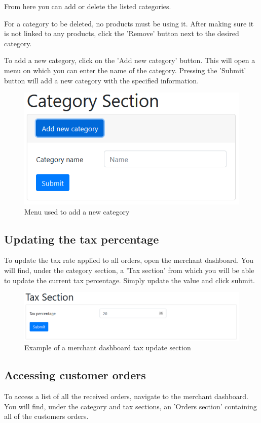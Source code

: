From here you can add or delete the listed categories.

For a category to be deleted, no products must be using it. After making sure it is not linked to any products, click the 'Remove' button next to the desired category.

To add a new category, click on the 'Add new category' button. This will open a menu on which you can enter the name of the category. Pressing the 'Submit' button will add a new category with the specified information.

\begin{figure}[H]
\centering
\includegraphics[scale=0.6]{res/Immagini/AddCategory}
\caption{Menu used to add a new category}
\end{figure}

\subsection{Updating the tax percentage}
To update the tax rate applied to all orders, open the merchant dashboard. You will find, under the category section, a 'Tax section' from which you will be able to update the current tax percentage. Simply update the value and click submit.
\begin{figure}[H]
\centering
\includegraphics[scale=0.6]{res/Immagini/TaxSection}
\caption{Example of a merchant dashboard tax update section}
\end{figure}


\subsection{Accessing customer orders}
To access a list of all the received orders, navigate to the merchant dashboard. You will find, under the category and tax sections, an 'Orders section' containing all of the customers orders.

